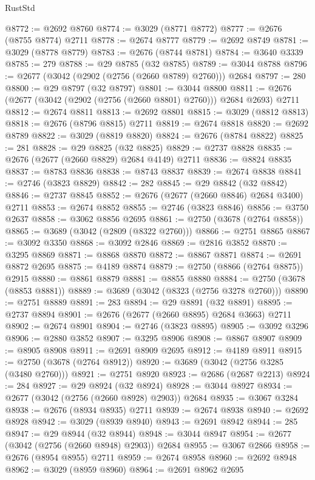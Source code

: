 \begin{lexlean}{RustStd}
\begin{coremodule}
{\begin{coremodule}
{{{{{{{{{{{{{{{{{{{{{{{{{{{{{{{{{{{{{{{{{{{{{{{{{{{{{{{@8772 := @2692 @8760
@8774 := @3029 (@8771 @8772)
@8777 := @2676 (@8755 @8774) @2711
@8778 := @2674 @8777
@8779 := @2692 @8749
@8781 := @3029 (@8778 @8779)
@8783 := @2676 (@8744 @8781)
@8784 := @3640 @3339
@8785 := 279
@8788 := @29 @8785 (@32 @8785)
@8789 := @3044 @8788
@8796 := @2677 (@3042 (@2902 (@2756 (@2660 @8789) @2760))) @2684
@8797 := 280
@8800 := @29 @8797 (@32 @8797)
@8801 := @3044 @8800
@8811 := @2676 (@2677 (@3042 (@2902 (@2756 (@2660 @8801) @2760))) @2684 @2693) @2711
@8812 := @2674 @8811
@8813 := @2692 @8801
@8815 := @3029 (@8812 @8813)
@8818 := @2676 (@8796 @8815) @2711
@8819 := @2674 @8818
@8820 := @2692 @8789
@8822 := @3029 (@8819 @8820)
@8824 := @2676 (@8784 @8822)
@8825 := 281
@8828 := @29 @8825 (@32 @8825)
@8829 := @2737 @8828
@8835 := @2676 (@2677 (@2660 @8829) @2684 @4149) @2711
@8836 := @8824 @8835
@8837 := @8783 @8836
@8838 := @8743 @8837
@8839 := @2674 @8838
@8841 := @2746 (@3823 @8829)
@8842 := 282
@8845 := @29 @8842 (@32 @8842)
@8846 := @2737 @8845
@8852 := @2676 (@2677 (@2660 @8846) @2684 @3400) @2711
@8853 := @2674 @8852
@8855 := @2746 (@3823 @8846)
@8856 := @3750 @2637
@8858 := @3062 @8856 @2695
@8861 := @2750 (@3678 (@2764 @8858))
@8865 := @3689 (@3042 (@2809 (@8322 @2760)))
@8866 := @2751 @8865
@8867 := @3092 @3350
@8868 := @3092 @2846
@8869 := @2816 @3852
@8870 := @3295 @8869
@8871 := @8868 @8870
@8872 := @8867 @8871
@8874 := @2691 @8872 @2695
@8875 := @4189 @8874
@8879 := @2750 (@8866 (@2764 @8875)) @2915
@8880 := @8861 @8879
@8881 := @8855 @8880
@8884 := @2750 (@3678 (@8853 @8881))
@8889 := @3689 (@3042 (@8323 (@2756 @3278 @2760)))
@8890 := @2751 @8889
@8891 := 283
@8894 := @29 @8891 (@32 @8891)
@8895 := @2737 @8894
@8901 := @2676 (@2677 (@2660 @8895) @2684 @3663) @2711
@8902 := @2674 @8901
@8904 := @2746 (@3823 @8895)
@8905 := @3092 @3296
@8906 := @2880 @3852
@8907 := @3295 @8906
@8908 := @8867 @8907
@8909 := @8905 @8908
@8911 := @2691 @8909 @2695
@8912 := @4189 @8911
@8915 := @2750 (@3678 (@2764 @8912))
@8920 := @3689 (@3042 (@2756 @3285 (@3480 @2760)))
@8921 := @2751 @8920
@8923 := @2686 (@2687 @2213)
@8924 := 284
@8927 := @29 @8924 (@32 @8924)
@8928 := @3044 @8927
@8934 := @2677 (@3042 (@2756 (@2660 @8928) @2903)) @2684
@8935 := @3067 @3284
@8938 := @2676 (@8934 @8935) @2711
@8939 := @2674 @8938
@8940 := @2692 @8928
@8942 := @3029 (@8939 @8940)
@8943 := @2691 @8942
@8944 := 285
@8947 := @29 @8944 (@32 @8944)
@8948 := @3044 @8947
@8954 := @2677 (@3042 (@2756 (@2660 @8948) @2903)) @2684
@8955 := @3067 @2866
@8958 := @2676 (@8954 @8955) @2711
@8959 := @2674 @8958
@8960 := @2692 @8948
@8962 := @3029 (@8959 @8960)
@8964 := @2691 @8962 @2695
}}}}}}}}}}}}}}}}}}}}}}}}}}}}}}}}}}}}}}}}}}}}}}}}}}}}}}}
\end{coremodule}}
\end{coremodule}
\end{lexlean}
